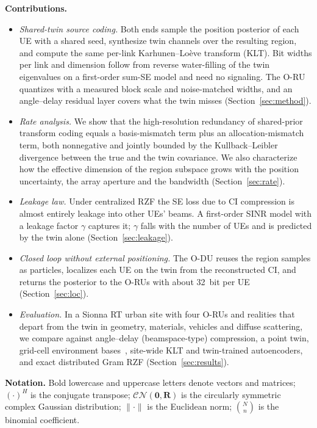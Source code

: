 \documentclass[journal]{IEEEtran}
\newcommand{\vect}[1]{\mathbf{#1}}
\begin{document}
\textbf{Contributions.}
\begin{itemize}
\item \emph{Shared-twin source coding.} Both ends sample the position posterior of each UE with a shared seed, synthesize twin channels over the resulting region, and compute the same per-link Karhunen--Lo\`eve transform (KLT). Bit widths per link and dimension follow from reverse water-filling of the twin eigenvalues on a first-order sum-SE model and need no signaling. The O-RU quantizes with a measured block scale and noise-matched widths, and an angle--delay residual layer covers what the twin misses (Section~\ref{sec:method}).
\item \emph{Rate analysis.} We show that the high-resolution redundancy of shared-prior transform coding equals a basis-mismatch term plus an allocation-mismatch term, both nonnegative and jointly bounded by the Kullback--Leibler divergence between the true and the twin covariance. We also characterize how the effective dimension of the region subspace grows with the position uncertainty, the array aperture and the bandwidth (Section~\ref{sec:rate}).
\item \emph{Leakage law.} Under centralized RZF the SE loss due to CI compression is almost entirely leakage into other UEs' beams. A first-order SINR model with a leakage factor $\gamma$ captures it; $\gamma$ falls with the number of UEs and is predicted by the twin alone (Section~\ref{sec:leakage}).
\item \emph{Closed loop without external positioning.} The O-DU reuses the region samples as particles, localizes each UE on the twin from the reconstructed CI, and returns the posterior to the O-RUs with about 32~bit per UE (Section~\ref{sec:loc}).
\item \emph{Evaluation.} In a Sionna RT urban site with four O-RUs and realities that depart from the twin in geometry, materials, vehicles and diffuse scattering, we compare against angle--delay (beamspace-type) compression, a point twin, grid-cell environment bases~\cite{cai2025ecb}, site-wide KLT and twin-trained autoencoders, and exact distributed Gram RZF (Section~\ref{sec:results}).
\end{itemize}

\textbf{Notation.} Bold lowercase and uppercase letters denote vectors and matrices; $(\cdot)^{H}$ is the conjugate transpose; $\mathcal{CN}(\vect{0},\vect{R})$ is the circularly symmetric complex Gaussian distribution; $\|\cdot\|$ is the Euclidean norm; $\binom{N}{n}$ is the binomial coefficient.
\end{document}
